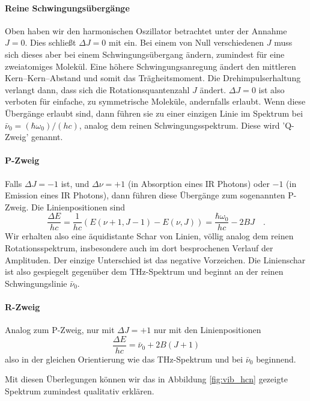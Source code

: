 \paragraph{Reine Schwingungsübergänge} Oben haben wir den  harmonischen Oszillator betrachtet unter der Annahme $J=0$. Dies schließt $\Delta J = 0$ mit ein. Bei einem von Null verschiedenen $J$ muss sich dieses aber bei einem Schwingungsübergang ändern, zumindest für eine zweiatomiges Molekül. Eine höhere Schwingungsanregung ändert den mittleren Kern--Kern--Abstand und somit das Trägheitsmoment. Die Drehimpulserhaltung verlangt dann, dass sich die Rotationsquantenzahl $J$ ändert. $\Delta J = 0$ ist also verboten für einfache, zu symmetrische Moleküle, andernfalls erlaubt. Wenn diese Übergänge erlaubt sind, dann führen sie zu einer einzigen Linie im Spektrum bei $ \bar{\nu}_0 = (\hbar \omega_0)/(h c) $, analog dem reinen Schwingungsspektrum. Diese wird 'Q-Zweig' genannt. 

\paragraph{P-Zweig} Falls $\Delta J = -1$ ist, und $\Delta \nu = +1$ (in Absorption eines IR Photons) oder $-1$ (in Emission eines IR Photons), dann führen diese Übergänge zum sogenannten P-Zweig. Die Linienpositionen sind
\begin{equation}
 \frac{\Delta E}{h c} = \frac{1}{h c} \left( E(\nu +1, J -1) - E(\nu, J) \right) = \frac{\hbar \omega_0}{h c}   - 2 B J \quad .
\end{equation}
Wir erhalten also eine äquidistante Schar von Linien, völlig analog dem reinen Rotationsspektrum, insbesondere auch im dort besprochenen Verlauf der Amplituden. Der einzige Unterschied ist das negative Vorzeichen. Die Linienschar ist also gespiegelt gegenüber dem THz-Spektrum und beginnt an der reinen Schwingungslinie $\bar{\nu}_0 $.

\paragraph{R-Zweig} Analog zum P-Zweig, nur mit  $\Delta J = +1$ nur mit den Linienpositionen
\begin{equation}
 \frac{\Delta E}{h c} =  \bar{\nu}_0   + 2 B ( J +1)
\end{equation}
also in der gleichen Orientierung wie das THz-Spektrum und bei $\bar{\nu}_0 $ beginnend.

Mit diesen Überlegungen können wir das in Abbildung \ref{fig:vib_hcn} gezeigte Spektrum zumindest qualitativ erklären.


